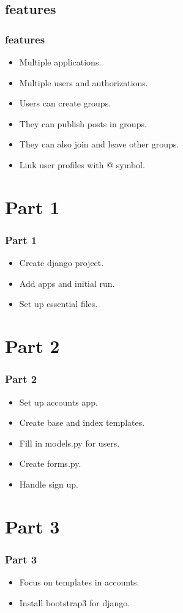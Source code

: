 \documentclass{beamer}
\begin{document}
\subsection{features}
\begin{frame}
	\frametitle{features}
	\begin{itemize}
		\item \color{green}Multiple applications.
		\color{black}
		\item Multiple users and authorizations.
		\item Users can create groups.
		\item They can publish posts in groups.
		\item They can also join and leave other groups.
		\item Link user profiles with @ symbol.
	\end{itemize}
\end{frame}

\section{Part 1}
\begin{frame}
	\frametitle{Part 1}
	\begin{itemize}
		\item Create django project.
		\item Add apps and initial run.
		\item Set up essential files.
	\end{itemize}
\end{frame}

\section{Part 2}
\begin{frame}
	\frametitle{Part 2}
	\begin{itemize}
		\item Set up accounts app.
		\item Create base and index templates.
		\item Fill in models.py for users.
		\item Create forms.py.
		\item Handle sign up.
	\end{itemize}
\end{frame}

\section{Part 3}
\begin{frame}
	\frametitle{Part 3}
	\begin{itemize}
		\item Focus on templates in accounts.
		\item Install bootstrap3 for django.
		
		
	\end{itemize}
\end{frame}
\end{document}
